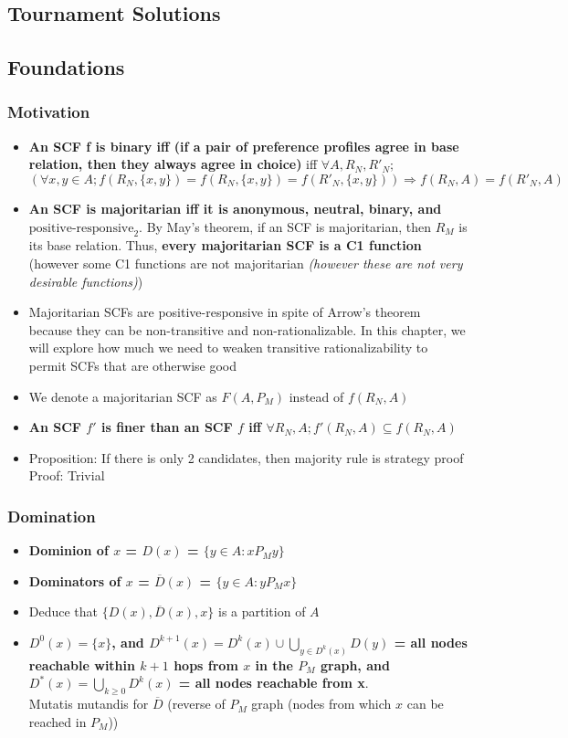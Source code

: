 \documentclass[20pt,a4paper,landscape]{extarticle}
\begin{document}
\begin{flushleft}
\section{Tournament Solutions}
\subsection{Foundations}
\subsubsection{Motivation}
\begin{itemize}
\item \textbf{An SCF f is binary iff (if a pair of preference profiles agree in base relation, then they always agree in choice)} iff $\forall A, R_N, R'_N;$\\
$(\forall x, y \in A; f(R_N, \{x, y\}) = f(R_N, \{x, y\}) = f(R'_N, \{x, y\})) \Rightarrow f(R_N, A) = f(R'_N, A)$
\item \textbf{An SCF is majoritarian iff it is anonymous, neutral, binary, and $\textrm{positive-responsive}_2$}. By May's theorem, if an SCF is majoritarian, then $R_M$ is its base relation. Thus, \textbf{every majoritarian SCF is a C1 function} (however some C1 functions are not majoritarian \textit{(however these are not very desirable functions)})
\clearpage
\item Majoritarian SCFs are positive-responsive in spite of Arrow's theorem because they can be non-transitive and non-rationalizable. In this chapter, we will explore how much we need to weaken transitive rationalizability to permit SCFs that are otherwise good
\item We denote a majoritarian SCF as $F(A, P_M)$ instead of $f(R_N, A)$
\item \textbf{An SCF $f'$ is finer than an SCF $f$ iff $\forall R_N, A; f'(R_N, A) \subseteq f(R_N, A)$}
\item Proposition: If there is only 2 candidates, then majority rule is strategy proof\\
Proof: Trivial
\end{itemize}
\clearpage
\subsubsection{Domination}
\begin{itemize}
\item \textbf{Dominion of $x$ = $D(x)$ = $\{y \in A: xP_My\}$}
\item \textbf{Dominators of $x$ = $\overline{D}(x)$ = $\{y \in A: yP_Mx\}$}
\item Deduce that $\{D(x), \overline{D}(x), x\}$ is a partition of $A$
\item \textbf{$D^0(x) = \{x\}$, and $D^{k+1}(x) = D^k(x) \cup \bigcup_{y \in D^k(x)} D(y)$ = all nodes reachable within $k+1$ hops from $x$ in the $P_M$ graph, and $D^\ast(x) = \bigcup_{k \geq 0}D^k(x)$ = all nodes reachable from x}.\\
Mutatis mutandis for $\overline{D}$ (reverse of $P_M$ graph (nodes from which $x$ can be reached in $P_M$))
\end{itemize}

\end{flushleft}
\end{document}
